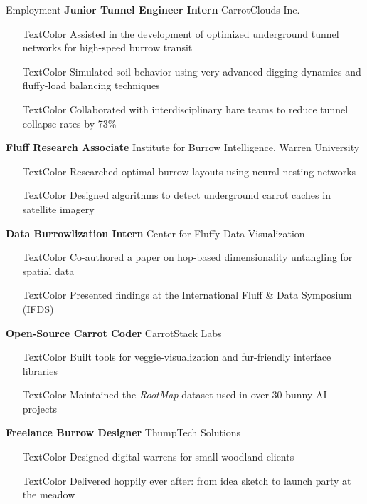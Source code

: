 \begin{rubric}{Employment}	
	\textbf{Junior Tunnel Engineer Intern} CarrotClouds Inc.
	\begin{itemize}[label={-}, labelsep=2pt, leftmargin=5pt]
		\item[TextColor] Assisted in the development of optimized underground tunnel networks for high-speed burrow transit
		\item[TextColor] Simulated soil behavior using very advanced digging dynamics and fluffy-load balancing techniques
		\item[TextColor] Collaborated with interdisciplinary hare teams to reduce tunnel collapse rates by 73\%
	\end{itemize}
	
	\textbf{Fluff Research Associate} Institute for Burrow Intelligence, Warren University
	\begin{itemize}[label={-}, labelsep=2pt, leftmargin=5pt]
		\item[TextColor] Researched optimal burrow layouts using neural nesting networks
		\item[TextColor] Designed algorithms to detect underground carrot caches in satellite imagery
	\end{itemize}
	
	\textbf{Data Burrowlization Intern} Center for Fluffy Data Visualization
	\begin{itemize}[label={-}, labelsep=2pt, leftmargin=5pt]
		\setlength\itemsep{0.0em}
		\item[TextColor] Co-authored a paper on hop-based dimensionality untangling for spatial data
		\item[TextColor] Presented findings at the International Fluff \& Data Symposium (IFDS)
	\end{itemize}
	
	\textbf{Open-Source Carrot Coder} CarrotStack Labs
	\begin{itemize}[label={-}, labelsep=2pt, leftmargin=5pt]
		\setlength\itemsep{0.0em}
		\item[TextColor] Built tools for veggie-visualization and fur-friendly interface libraries
		\item[TextColor] Maintained the \emph{RootMap} dataset used in over 30 bunny AI projects
	\end{itemize}
	
	\textbf{Freelance Burrow Designer} ThumpTech Solutions
	\begin{itemize}[label={-}, labelsep=2pt, leftmargin=5pt]
		\setlength\itemsep{0.0em}
		\item[TextColor] Designed digital warrens for small woodland clients
		\item[TextColor] Delivered hoppily ever after: from idea sketch to launch party at the meadow
		\vspace*{-\baselineskip}
	\end{itemize}
\end{rubric}